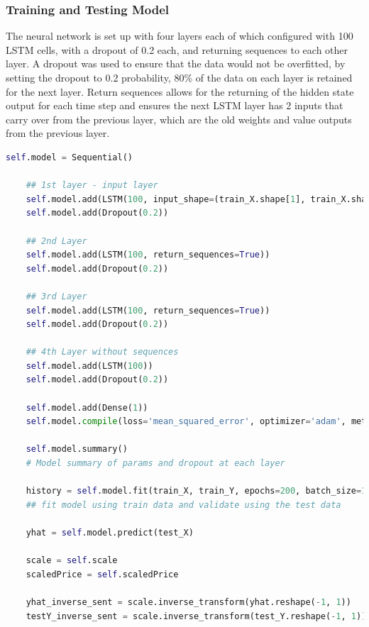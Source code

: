 \documentclass[oneside, 12pt]{article}
\begin{document}
		\subsubsection{Training and Testing Model}
		
		The neural network is set up with four layers each of which configured with 100 LSTM cells, with a dropout of 0.2 each, and returning sequences to each other layer. A dropout was used to ensure that the data would not be overfitted, by setting the dropout to 0.2 probability, 80\% of the data on each layer is retained for the next layer. Return sequences allows for the returning of the hidden state output for each time step and ensures the next LSTM layer has 2 inputs that carry over from the previous layer, which are the old weights and value outputs from the previous layer.
			
		\begin{lstlisting}[language=python, caption=LSTM model creation\, layering\, compiling and fitting]
	self.model = Sequential()
	
	## 1st layer - input layer
	self.model.add(LSTM(100, input_shape=(train_X.shape[1], train_X.shape[2]), return_sequences=True))
	self.model.add(Dropout(0.2))
	
	## 2nd Layer
	self.model.add(LSTM(100, return_sequences=True))
	self.model.add(Dropout(0.2))
	
	## 3rd Layer
	self.model.add(LSTM(100, return_sequences=True))
	self.model.add(Dropout(0.2))
	
	## 4th Layer without sequences
	self.model.add(LSTM(100))
	self.model.add(Dropout(0.2))
	
	self.model.add(Dense(1))
	self.model.compile(loss='mean_squared_error', optimizer='adam', metrics=['mse', 'mae', 'mape'])
	
	self.model.summary()
	# Model summary of params and dropout at each layer
	
	history = self.model.fit(train_X, train_Y, epochs=200, batch_size=1000, validation_data=(test_X, test_Y), verbose=0, shuffle=False, callbacks=[TQDMCallback()])
	## fit model using train data and validate using the test data
	
	yhat = self.model.predict(test_X)
	
	scale = self.scale
	scaledPrice = self.scaledPrice
	
	yhat_inverse_sent = scale.inverse_transform(yhat.reshape(-1, 1))
	testY_inverse_sent = scale.inverse_transform(test_Y.reshape(-1, 1))
		\end{lstlisting}	
		
\end{document}

